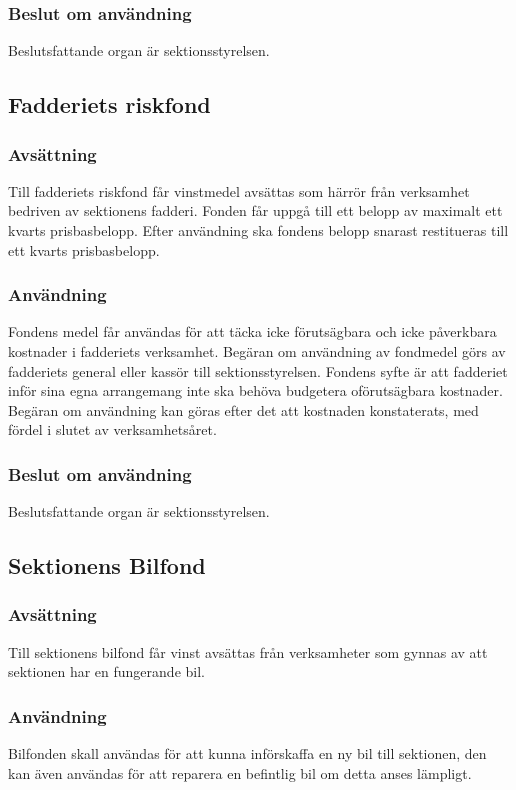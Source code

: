 \documentclass{datateknologsektionen-document}
\begin{document}
\subsubsection{Beslut om användning}
Beslutsfattande organ är sektionsstyrelsen.


\subsection{Fadderiets riskfond}
\subsubsection{Avsättning}
Till fadderiets riskfond får vinstmedel avsättas som härrör från verksamhet bedriven av
sektionens fadderi. Fonden får uppgå till ett belopp av maximalt ett kvarts
prisbasbelopp. Efter användning ska fondens belopp snarast restitueras till ett kvarts
prisbasbelopp.
\subsubsection{Användning}
Fondens medel får användas för att täcka icke förutsägbara och icke påverkbara kostnader i
fadderiets verksamhet. Begäran om användning av fondmedel görs av fadderiets general eller
kassör till sektionsstyrelsen. Fondens syfte är att fadderiet inför sina egna
arrangemang inte ska behöva budgetera oförutsägbara kostnader. Begäran om användning kan
göras efter det att kostnaden konstaterats, med fördel i slutet av verksamhetsåret.
\subsubsection{Beslut om användning}
Beslutsfattande organ är sektionsstyrelsen.
\subsection{Sektionens Bilfond}
\subsubsection{Avsättning}
Till sektionens bilfond får vinst avsättas från verksamheter som gynnas av att sektionen har en
fungerande bil.
\subsubsection{Användning}
Bilfonden skall användas för att kunna införskaffa en ny bil till sektionen, den kan även
användas för att reparera en befintlig bil om detta anses lämpligt.
\end{document}
